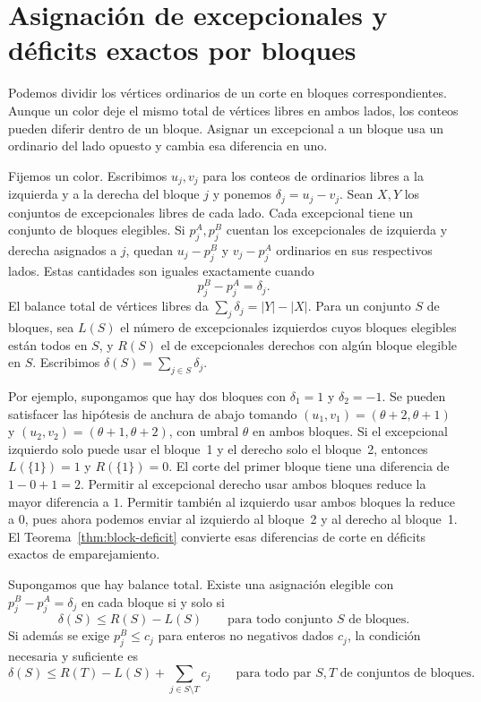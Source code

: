 \section{Asignación de excepcionales y déficits exactos por bloques}\label{sec:block-routing}

Podemos dividir los vértices ordinarios de un corte en bloques correspondientes. Aunque un color deje el mismo total de vértices libres en ambos lados, los conteos pueden diferir dentro de un bloque. Asignar un excepcional a un bloque usa un ordinario del lado opuesto y cambia esa diferencia en uno.

Fijemos un color. Escribimos \(u_j,v_j\) para los conteos de ordinarios libres a la izquierda y a la derecha del bloque \(j\) y ponemos \(\delta_j=u_j-v_j\). Sean \(X,Y\) los conjuntos de excepcionales libres de cada lado. Cada excepcional tiene un conjunto de bloques elegibles. Si \(p^A_j,p^B_j\) cuentan los excepcionales de izquierda y derecha asignados a \(j\), quedan \(u_j-p^B_j\) y \(v_j-p^A_j\) ordinarios en sus respectivos lados. Estas cantidades son iguales exactamente cuando
\[
 p^B_j-p^A_j=\delta_j.
\]
El balance total de vértices libres da \(\sum_j\delta_j=|Y|-|X|\). Para un conjunto \(S\) de bloques, sea \(L(S)\) el número de excepcionales izquierdos cuyos bloques elegibles están todos en \(S\), y \(R(S)\) el de excepcionales derechos con algún bloque elegible en \(S\). Escribimos \(\delta(S)=\sum_{j\in S}\delta_j\).

Por ejemplo, supongamos que hay dos bloques con \(\delta_1=1\) y \(\delta_2=-1\). Se pueden satisfacer las hipótesis de anchura de abajo tomando \((u_1,v_1)=(\theta+2,\theta+1)\) y \((u_2,v_2)=(\theta+1,\theta+2)\), con umbral \(\theta\) en ambos bloques. Si el excepcional izquierdo solo puede usar el bloque~1 y el derecho solo el bloque~2, entonces \(L(\{1\})=1\) y \(R(\{1\})=0\). El corte del primer bloque tiene una diferencia de \(1-0+1=2\). Permitir al excepcional derecho usar ambos bloques reduce la mayor diferencia a \(1\). Permitir también al izquierdo usar ambos bloques la reduce a \(0\), pues ahora podemos enviar al izquierdo al bloque~2 y al derecho al bloque~1. El Teorema~\ref{thm:block-deficit} convierte esas diferencias de corte en déficits exactos de emparejamiento.

\begin{lemma}\label{lem:block-assignment}
Supongamos que hay balance total. Existe una asignación elegible con \(p^B_j-p^A_j=\delta_j\) en cada bloque si y solo si
\[
 \delta(S)\le R(S)-L(S)
 \qquad\text{para todo conjunto \(S\) de bloques.}
 \tag{A}\label{eq:block-assignment}
\]
Si además se exige \(p^B_j\le c_j\) para enteros no negativos dados \(c_j\), la condición necesaria y suficiente es
\[
 \delta(S)\le R(T)-L(S)+\sum_{j\in S\setminus T}c_j
 \qquad\text{para todo par \(S,T\) de conjuntos de bloques.}
 \tag{C}\label{eq:block-capacity}
\]
\end{lemma}

